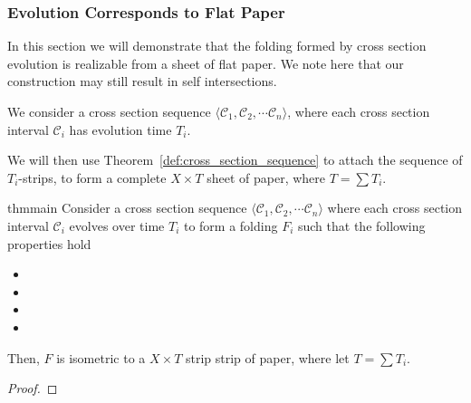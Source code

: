 \subsubsection{Evolution Corresponds to Flat Paper}
\label{sec:flat}

In this section we will demonstrate that the folding formed by cross section evolution is realizable from a sheet of flat paper.
We note here that our construction may still result in self intersections.

We consider a cross section sequence $\langle \mathcal C_1, \mathcal C_2,\cdots \mathcal C_n \rangle$,
where each cross section interval $\mathcal C_i$ has evolution time $T_i$.

We will then use Theorem~\ref{def:cross_section_sequence} to attach the sequence of $T_i$-strips,
to form a complete $X\times T$ sheet of paper, where $T = \sum T_i$.

\begin{restatable}{thm}{main}
\label{thm:main}
Consider a cross section sequence $\langle \mathcal C_1, \mathcal C_2,\cdots \mathcal C_n \rangle$ where each
cross section interval $\mathcal C_i$ evolves over time $T_i$ to form a folding $F_i$ such that the following properties hold
\begin{itemize}
    \item[] \vspace{-2em}\OrthogonalVelocity*
    \item[] \vspace{-2em}\JointOrthogonalVelocity*
    \item[] \vspace{-2em}\LeftRightVelocity*
    \item[] \vspace{-2em}\JointVelocity*
\end{itemize}
Then, $F$ is isometric to a $X\times T$ strip strip of paper, where let $T = \sum T_i$.
\end{restatable}
\begin{proof}

\end{proof}
